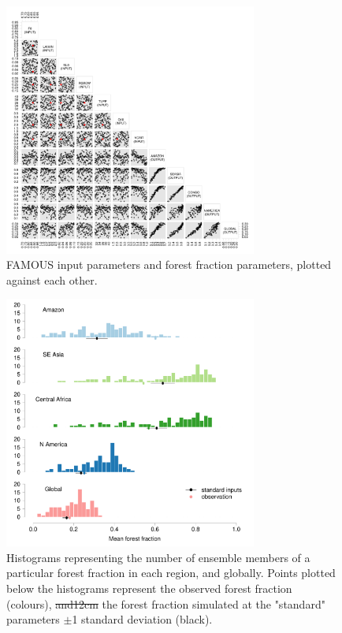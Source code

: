 \documentclass[esd, article]{copernicus} %
\providecommand{\DIFadd}[1]{{\protect\color{blue}\uwave{#1}}} %
\providecommand{\DIFdel}[1]{{\protect\color{red}\sout{#1}}}                      %
\providecommand{\DIFaddFL}[1]{\DIFadd{#1}} %
\providecommand{\DIFdelFL}[1]{\DIFdel{#1}} %
\providecommand{\DIFaddbeginFL}{} %
\providecommand{\DIFaddendFL}{} %
\providecommand{\DIFdelbeginFL}{} %
\providecommand{\DIFdelendFL}{} %
\begin{document}
\begin{figure}[t]
\DIFdelbeginFL %
\DIFdelendFL \DIFaddbeginFL \includegraphics[width=8.3cm]{graphics/frac_pairs.pdf}
\DIFaddendFL \caption{FAMOUS input parameters and forest fraction parameters, plotted against each other.}
\label{fig:frac_pairs}
\end{figure}

\begin{figure}[t]
\DIFdelbeginFL %
\DIFdelendFL \DIFaddbeginFL \includegraphics[width=8.3cm]{graphics/fraction_histogram_with_discrepancy_standard.pdf}
\DIFaddendFL \caption{Histograms representing the number of ensemble members of a particular forest fraction in each region, and globally. Points plotted below the histograms represent the observed forest fraction (colours), \DIFdelbeginFL \DIFdelFL{and12cm }\DIFdelendFL \DIFaddbeginFL \DIFaddFL{and }\DIFaddendFL the forest fraction simulated at the "standard" parameters $\pm$1 standard deviation (black).}
\label{fig:fraction_histogram_with_discrepancy_standard}
\end{figure}
\end{document}
